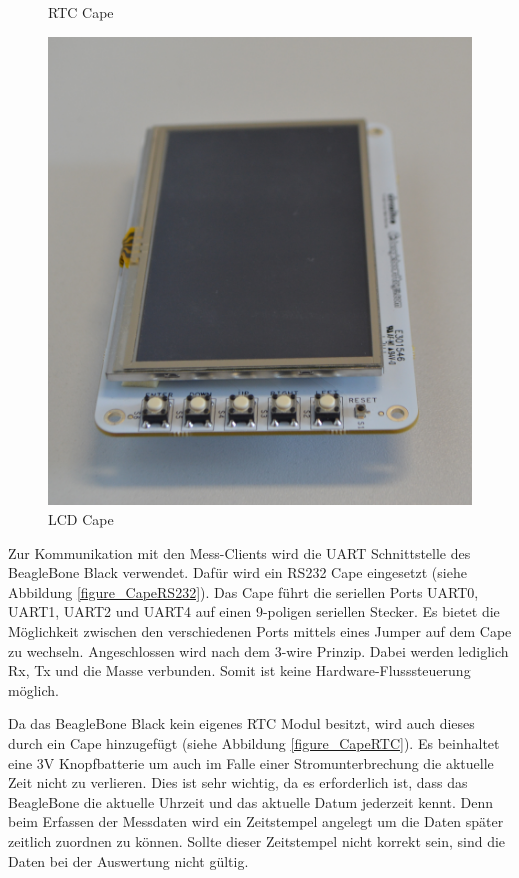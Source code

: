 \begin{figure}[H]
  \caption{RTC Cape}\label{figure_CapeRTC}
\endminipage\hfill
{}%
  \includegraphics[width=\linewidth]{img/general/CapeLCD.png}
  \caption{LCD Cape}\label{figure_CapeLCD}
\endminipage
\end{figure}


Zur Kommunikation mit den Mess-Clients wird die \ac{UART} Schnittstelle des BeagleBone Black verwendet. Dafür wird ein RS232 Cape eingesetzt (siehe Abbildung \ref{figure_CapeRS232}). Das Cape führt die seriellen Ports UART0, UART1, UART2 und UART4 auf einen 9-poligen seriellen Stecker. Es bietet die Möglichkeit zwischen den verschiedenen Ports mittels eines Jumper auf dem Cape zu wechseln. Angeschlossen wird nach dem 3-wire Prinzip. Dabei werden lediglich Rx, Tx und die Masse verbunden. Somit ist keine Hardware-Flusssteuerung möglich.\ 

Da das BeagleBone Black kein eigenes \ac{RTC} Modul besitzt, wird auch dieses durch ein Cape hinzugefügt (siehe Abbildung \ref{figure_CapeRTC}). Es beinhaltet eine 3V Knopfbatterie um auch im Falle einer Stromunterbrechung die aktuelle Zeit nicht zu verlieren. Dies ist sehr wichtig, da es erforderlich ist, dass das BeagleBone die aktuelle Uhrzeit und das aktuelle Datum jederzeit kennt. Denn beim Erfassen der Messdaten wird ein Zeitstempel angelegt um die Daten später zeitlich zuordnen zu können. Sollte dieser Zeitstempel nicht korrekt sein, sind die Daten bei der Auswertung nicht gültig.\ 

